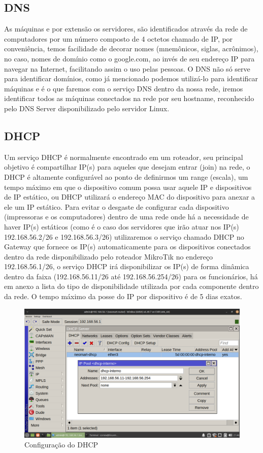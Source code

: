 \documentclass[12pt]{article}
\begin{document}
\subsection{DNS}
As máquinas e por extensão os servidores, são identificados através da rede de computadores por um número composto de 4 octetos chamado de IP, por conveniência, temos facilidade de decorar nomes (mnemônicos, siglas, acrônimos), no caso, nomes de domínio como o google.com, ao invés de seu endereço IP para navegar na Internet, facilitando assim o uso pelas pessoas. O DNS não só serve para identificar domínios, como já mencionado podemos utilizá-lo para identificar máquinas e é o que faremos com o serviço DNS dentro da nossa rede, iremos identificar todos as máquinas conectados na rede por seu hostname, reconhecido pelo DNS Server disponibilizado pelo servidor Linux.
\subsection{DHCP}
Um serviço DHCP é normalmente encontrado em um roteador, seu principal objetivo é compartilhar IP(s) para aqueles que desejam entrar (join) na rede, o DHCP é altamente configurável ao ponto de definirmos um range (escala), um tempo máximo em que o dispositivo comum possa usar aquele IP e dispositivos de IP estático, ou DHCP utilizará o endereço MAC do dispositivo para anexar a ele um IP estático.
Para evitar o desgaste de configurar cada dispositivo (impressoras e os computadores) dentro de uma rede onde há a necessidade de haver IP(s) estáticos (como é o caso dos servidores que irão atuar nos IP(s) 192.168.56.2/26 e 192.168.56.3/26) utilizaremos o serviço chamado DHCP no Gateway que fornece os IP(s) automaticamente para os dispositivos conectados dentro da rede disponibilizado pelo roteador MikroTik no endereço 192.168.56.1/26, o serviço DHCP irá disponibilizar os IP(s)  de forma dinâmica dentro da faixa (192.168.56.11/26 até 192.168.56.254/26) para os funcionários, há em anexo a lista do tipo de disponibilidade utilizada por cada componente dentro da rede. O tempo máximo da posse do IP por dispositivo é de 5 dias exatos.
\begin{figure}[ht]
\centering
\includegraphics[height=0.5\textwidth]{roteador-dhcp-range.png}
\caption{Configuração do DHCP}
\label{fig:dhcp}
\end{figure}
\end{document}

